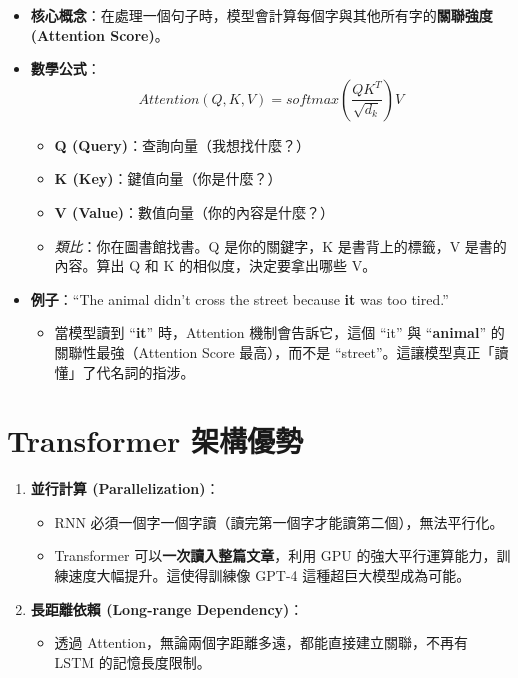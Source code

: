 \documentclass[
  letterpaper,
  DIV=11,
  numbers=noendperiod]{scrreprt}
\providecommand{\tightlist}{%
  \setlength{\itemsep}{0pt}\setlength{\parskip}{0pt}}
\begin{document}
\begin{itemize}
\tightlist
\item
  \textbf{核心概念}：在處理一個句子時，模型會計算每個字與其他所有字的\textbf{關聯強度
  (Attention Score)}。
\item
  \textbf{數學公式}：
  \[ Attention(Q, K, V) = softmax(\frac{QK^T}{\sqrt{d_k}})V \]

  \begin{itemize}
  \tightlist
  \item
    \textbf{Q (Query)}：查詢向量（我想找什麼？）
  \item
    \textbf{K (Key)}：鍵值向量（你是什麼？）
  \item
    \textbf{V (Value)}：數值向量（你的內容是什麼？）
  \item
    \emph{類比}：你在圖書館找書。Q 是你的關鍵字，K 是書背上的標籤，V
    是書的內容。算出 Q 和 K 的相似度，決定要拿出哪些 V。
  \end{itemize}
\item
  \textbf{例子}：``The animal didn't cross the street because
  \textbf{it} was too tired.''

  \begin{itemize}
  \tightlist
  \item
    當模型讀到 ``\textbf{it}'' 時，Attention 機制會告訴它，這個 ``it''
    與 ``\textbf{animal}'' 的關聯性最強（Attention Score 最高），而不是
    ``street''。這讓模型真正「讀懂」了代名詞的指涉。
  \end{itemize}
\end{itemize}

\section{Transformer 架構優勢}\label{sec-transformer-arch}

\begin{enumerate}
\def\labelenumi{\arabic{enumi}.}
\tightlist
\item
  \textbf{並行計算 (Parallelization)}：

  \begin{itemize}
  \tightlist
  \item
    RNN 必須一個字一個字讀（讀完第一個字才能讀第二個），無法平行化。
  \item
    Transformer 可以\textbf{一次讀入整篇文章}，利用 GPU
    的強大平行運算能力，訓練速度大幅提升。這使得訓練像 GPT-4
    這種超巨大模型成為可能。
  \end{itemize}
\item
  \textbf{長距離依賴 (Long-range Dependency)}：

  \begin{itemize}
  \tightlist
  \item
    透過 Attention，無論兩個字距離多遠，都能直接建立關聯，不再有 LSTM
    的記憶長度限制。
  \end{itemize}
\end{enumerate}
\end{document}
